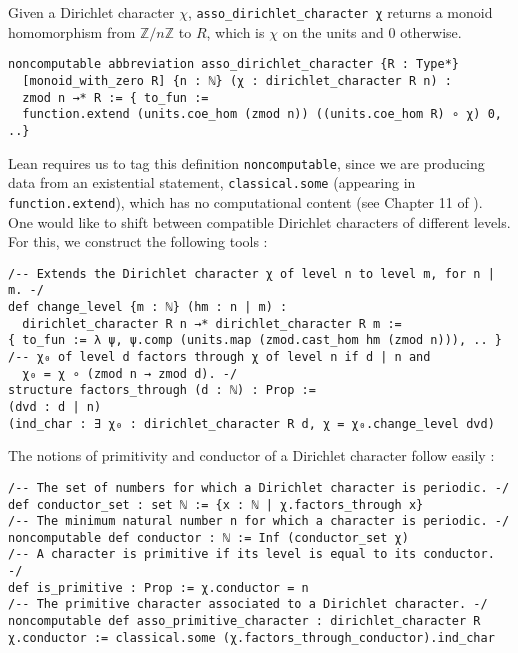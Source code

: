 \documentclass[a4paper,UKenglish,cleveref, autoref, thm-restate]{lipics-v2021}
\newcommand{\lean}[1]{\texttt{#1}\xspace} %
\begin{document}
Given a Dirichlet character $\chi$, \lean{asso\_dirichlet\_character χ} returns a monoid homomorphism from $\mathbb{Z}/n \mathbb{Z}$ 
to $R$, which is $\chi$ on the units and 0 otherwise. 
\begin{lstlisting}
noncomputable abbreviation asso_dirichlet_character {R : Type*} 
  [monoid_with_zero R] {n : ℕ} (χ : dirichlet_character R n) : 
  zmod n →* R := { to_fun := 
  function.extend (units.coe_hom (zmod n)) ((units.coe_hom R) ∘ χ) 0, ..}
\end{lstlisting}
Lean requires us to tag this definition \lean{noncomputable}, since we are producing data from an existential statement, 
\lean{classical.some} (appearing in \lean{function.extend}), which has no computational content (see Chapter 11 of \cite{TPIL}).
One would like to shift between compatible Dirichlet characters of different levels. For this, we construct the following tools : 
\begin{lstlisting}
/-- Extends the Dirichlet character χ of level n to level m, for n | m. -/
def change_level {m : ℕ} (hm : n | m) : 
  dirichlet_character R n →* dirichlet_character R m :=
{ to_fun := λ ψ, ψ.comp (units.map (zmod.cast_hom hm (zmod n))), .. }
/-- χ₀ of level d factors through χ of level n if d | n and 
  χ₀ = χ ∘ (zmod n → zmod d). -/
structure factors_through (d : ℕ) : Prop :=
(dvd : d | n) 
(ind_char : ∃ χ₀ : dirichlet_character R d, χ = χ₀.change_level dvd)
\end{lstlisting}
The notions of primitivity and conductor of a Dirichlet character follow easily : \newpage
\begin{lstlisting}
/-- The set of numbers for which a Dirichlet character is periodic. -/
def conductor_set : set ℕ := {x : ℕ | χ.factors_through x}
/-- The minimum natural number n for which a character is periodic. -/
noncomputable def conductor : ℕ := Inf (conductor_set χ)
/-- A character is primitive if its level is equal to its conductor. -/
def is_primitive : Prop := χ.conductor = n
/-- The primitive character associated to a Dirichlet character. -/
noncomputable def asso_primitive_character : dirichlet_character R χ.conductor := classical.some (χ.factors_through_conductor).ind_char
\end{lstlisting}
\end{document}
